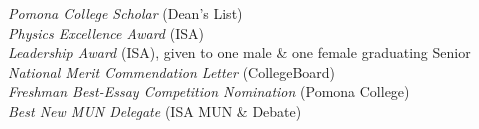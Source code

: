 {\sl Pomona College Scholar} (Dean's List) \\
{\sl Physics Excellence Award} (ISA)\\
{\sl Leadership Award }(ISA), given to one male \& one female graduating Senior \\
{\sl National Merit Commendation Letter}  (CollegeBoard) \\
{\sl Freshman Best-Essay Competition Nomination} (Pomona College) \\
{\sl Best New MUN Delegate} (ISA MUN \& Debate)
